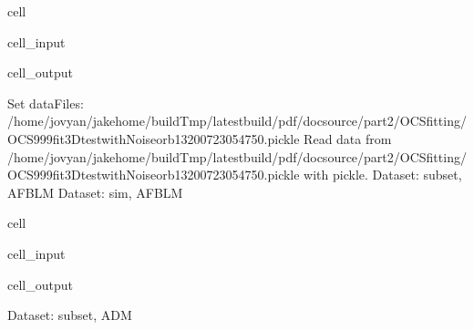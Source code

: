 \documentclass[letterpaper,table,10pt,english]{jupyterBook}
\begin{document}
\begin{sphinxuseclass}{cell}
\begin{sphinxVerbatimInput}
\begin{sphinxuseclass}{cell_input}
\begin{sphinxVerbatim}[commandchars=\\\{\}]
\end{sphinxVerbatim}

\end{sphinxuseclass}\end{sphinxVerbatimInput}
\begin{sphinxVerbatimOutput}

\begin{sphinxuseclass}{cell_output}
\begin{sphinxVerbatim}[commandchars=\\\{\}]
Set dataFiles: /home/jovyan/jake\PYGZhy{}home/buildTmp/\PYGZus{}latest\PYGZus{}build/pdf/doc\PYGZhy{}source/part2/OCSfitting/OCS\PYGZus{}999\PYGZus{}fit\PYGZus{}3D\PYGZhy{}test\PYGZus{}withNoise\PYGZus{}orb13\PYGZus{}200723\PYGZus{}05\PYGZhy{}47\PYGZhy{}50.pickle
Read data from /home/jovyan/jake\PYGZhy{}home/buildTmp/\PYGZus{}latest\PYGZus{}build/pdf/doc\PYGZhy{}source/part2/OCSfitting/OCS\PYGZus{}999\PYGZus{}fit\PYGZus{}3D\PYGZhy{}test\PYGZus{}withNoise\PYGZus{}orb13\PYGZus{}200723\PYGZus{}05\PYGZhy{}47\PYGZhy{}50.pickle with pickle.
Dataset: subset, AFBLM
Dataset: sim, AFBLM
\end{sphinxVerbatim}

\noindent{}

\end{sphinxuseclass}\end{sphinxVerbatimOutput}

\end{sphinxuseclass}
\begin{sphinxuseclass}{cell}\begin{sphinxVerbatimInput}

\begin{sphinxuseclass}{cell_input}
\begin{sphinxVerbatim}[commandchars=\\\{\}]
  
\end{sphinxVerbatim}

\end{sphinxuseclass}\end{sphinxVerbatimInput}
\begin{sphinxVerbatimOutput}

\begin{sphinxuseclass}{cell_output}
\begin{sphinxVerbatim}[commandchars=\\\{\}]
Dataset: subset, ADM
\end{sphinxVerbatim}

\noindent{}

\end{sphinxuseclass}\end{sphinxVerbatimOutput}

\end{sphinxuseclass}
\end{document}
